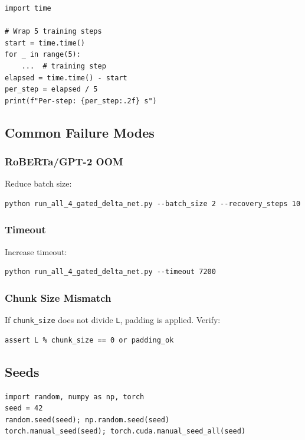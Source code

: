 \begin{lstlisting}
import time

# Wrap 5 training steps
start = time.time()
for _ in range(5):
    ...  # training step
elapsed = time.time() - start
per_step = elapsed / 5
print(f"Per-step: {per_step:.2f} s")
\end{lstlisting}

\subsection{Common Failure Modes}

\subsubsection{RoBERTa/GPT-2 OOM}

Reduce batch size:

\begin{lstlisting}
python run_all_4_gated_delta_net.py --batch_size 2 --recovery_steps 10
\end{lstlisting}

\subsubsection{Timeout}

Increase timeout:

\begin{lstlisting}
python run_all_4_gated_delta_net.py --timeout 7200
\end{lstlisting}

\subsubsection{Chunk Size Mismatch}

If \texttt{chunk\_size} does not divide \texttt{L}, padding is applied. Verify:

\begin{lstlisting}
assert L % chunk_size == 0 or padding_ok
\end{lstlisting}

\subsection{Seeds}

\begin{lstlisting}
import random, numpy as np, torch
seed = 42
random.seed(seed); np.random.seed(seed)
torch.manual_seed(seed); torch.cuda.manual_seed_all(seed)
\end{lstlisting}

